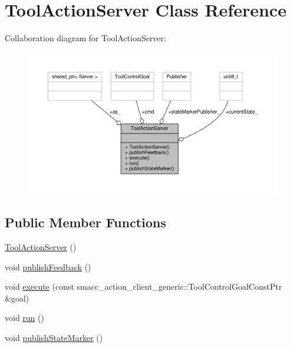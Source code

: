 \hypertarget{classToolActionServer}{}\section{Tool\+Action\+Server Class Reference}
\label{classToolActionServer}


Collaboration diagram for Tool\+Action\+Server\+:
\nopagebreak
\begin{figure}[H]
\begin{center}
\leavevmode
\includegraphics[width=350pt]{classToolActionServer__coll__graph}
\end{center}
\end{figure}
\subsection*{Public Member Functions}
\begin{DoxyCompactItemize}
\item 
\hyperlink{classToolActionServer_a780b72c834c95d45941ff6374c03c1c6}{Tool\+Action\+Server} ()
\item 
void \hyperlink{classToolActionServer_afe566312095ca250bc32f98a11774f2b}{publish\+Feedback} ()
\item 
void \hyperlink{classToolActionServer_a34bd6fce77510778d5a51385afeb36bb}{execute} (const smacc\+\_\+action\+\_\+client\+\_\+generic\+::\+Tool\+Control\+Goal\+Const\+Ptr \&goal)
\item 
void \hyperlink{classToolActionServer_adbf39061e0f8c74352cbdc695d7d8469}{run} ()
\item 
void \hyperlink{classToolActionServer_aef01c70e358c933855db3a37b46a3740}{publish\+State\+Marker} ()
\end{DoxyCompactItemize}
